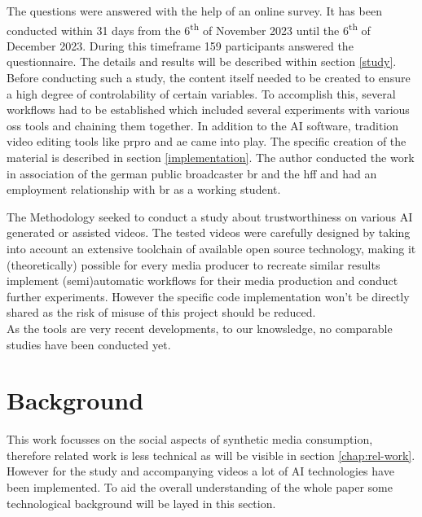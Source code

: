 \documentclass[
  a4paper,  %
  twoside,  %
  bibliography=totoc,
  headsepline,
  cleardoublepage=empty,
  parskip=half,
  draft=false
]{scrbook}
\begin{document}
The questions were answered with the help of an online survey. It has been conducted within 31 days from the 6\textsuperscript{th} of November 2023 until the 6\textsuperscript{th} of December 2023. During this timeframe 159 participants answered the questionnaire. The details and results will be described within section \ref{study}. \\
Before conducting such a study, the content itself needed to be created to ensure a high degree of controlability of certain variables. To accomplish this, several workflows had to be established which included several experiments with various \gls{oss} tools and chaining them together. In addition to the AI software, tradition video editing tools like \gls{prpro} and \gls{ae} came into play. The specific creation of the material is described in section \ref{implementation}. The author conducted the work in association of the german public broadcaster \gls{br} and the \gls{hff} and had an employment relationship with \gls{br} as a working student.

The Methodology seeked to conduct a study about trustworthiness on various AI generated or assisted videos.
The tested videos were carefully designed by taking into account an extensive toolchain of available open source technology, making it (theoretically) possible for every media producer to recreate similar results implement (semi)automatic workflows for their media production and conduct further experiments. However the specific code implementation won't be directly shared as the risk of misuse of this project should be reduced. \\
As the tools are very recent developments, to our knowsledge, no comparable studies have been conducted yet.


\chapter{Background}
\label{chap:background}

This work focusses on the social aspects of synthetic media consumption, therefore related work is less technical as will be visible in section \ref{chap:rel-work}. However for the study and accompanying videos a lot of AI technologies have been implemented. To aid the overall understanding of the whole paper some technological background will be layed in this section.
\end{document}
